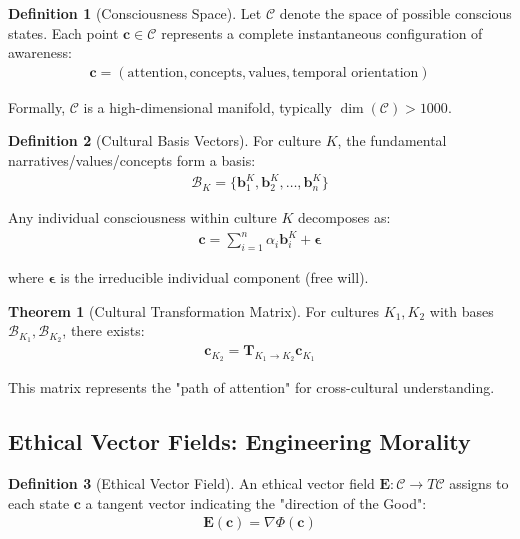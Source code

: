 \documentclass[11pt,a4paper]{article}
\theoremstyle{definition}
\newtheorem{definition}{Definition}[section]
\newtheorem{theorem}{Theorem}[section]
\theoremstyle{remark}
\newcommand{\CC}{\mathcal{C}}
\newcommand{\EE}{\mathbf{E}}
\newcommand{\bb}{\mathbf{b}}
\newcommand{\cc}{\mathbf{c}}
\newcommand{\TT}{\mathbf{T}}
\begin{document}
\begin{small}
\begin{definition}[Consciousness Space]
Let $\CC$ denote the space of possible conscious states. Each point $\cc \in \CC$ represents a complete instantaneous configuration of awareness:
\begin{align}
\cc = (\text{attention}, \text{concepts}, \text{values}, \text{temporal orientation})
\end{align}

Formally, $\CC$ is a high-dimensional manifold, typically $\dim(\CC) > 1000$.
\end{definition}

\begin{definition}[Cultural Basis Vectors]
For culture $K$, the fundamental narratives/values/concepts form a basis:
\begin{align}
\mathcal{B}_K = \{\bb_1^K, \bb_2^K, \ldots, \bb_n^K\}
\end{align}

Any individual consciousness within culture $K$ decomposes as:
\begin{align}
\cc = \sum_{i=1}^n \alpha_i \bb_i^K + \boldsymbol{\epsilon}
\end{align}

where $\boldsymbol{\epsilon}$ is the irreducible individual component (free will).
\end{definition}

\begin{theorem}[Cultural Transformation Matrix]
For cultures $K_1, K_2$ with bases $\mathcal{B}_{K_1}, \mathcal{B}_{K_2}$, there exists:
\begin{align}
\cc_{K_2} = \TT_{K_1 \to K_2} \cc_{K_1}
\end{align}

This matrix represents the "path of attention" for cross-cultural understanding.
\end{theorem}

\subsection{Ethical Vector Fields: Engineering Morality}

\begin{definition}[Ethical Vector Field]
An ethical vector field $\EE: \CC \to T\CC$ assigns to each state $\cc$ a tangent vector indicating the "direction of the Good":
\begin{align}
\EE(\cc) = \nabla \Phi(\cc)
\end{align}


\end{definition}
\end{small}
\end{document}
